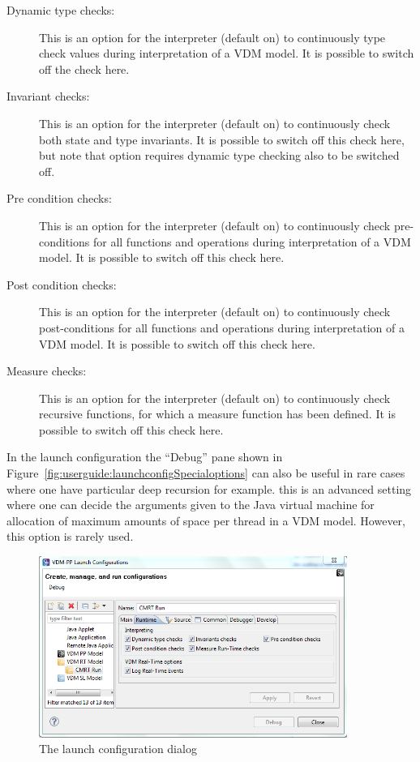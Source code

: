 \documentclass{overturerepchap}
\begin{document}
\begin{description}
\item[Dynamic type checks:] This is an option for the interpreter (default on) 
  to continuously type check  values during interpretation of a VDM model.
  It is possible to switch off the check here.
\item[Invariant checks:] This is an option for the interpreter (default on) 
  to continuously check both state and type invariants.
  It is possible to switch off
  this check here, but note that option requires dynamic type
  checking also to be switched off.
\item[Pre condition checks:] This is an option for the interpreter (default on) 
  to continuously check pre-conditions for all functions and operations
  during interpretation of a VDM model. It is possible to switch off
  this check here.
\item[Post condition checks:] This is an option for the interpreter (default on) 
  to continuously check post-conditions for all functions and operations
  during interpretation of a VDM model. It is possible to switch off
  this check here.
\item[Measure checks:] This is an option for the interpreter (default
  on) to continuously check recursive functions, for which a
  measure function has been defined. It is possible to switch off this
  check here.
\end{description}

In the launch
configuration the ``Debug'' pane shown in
Figure~\ref{fig:userguide:launchconfigSpecialoptions} can also be
useful in rare cases where one have particular deep recursion for
example. this is an advanced setting where one can decide the
arguments given to the Java virtual machine for allocation of maximum
amounts of space per thread in a VDM model. However, this option is
rarely used.

\begin{figure}[htp]
\begin{center}
  \includegraphics[width=380px]{screenDumps/launchconfigRToptions}
  \caption{The launch configuration dialog}
  \label{fig:userguide:launchconfigRToptions}
\end{center}
\end{figure}
\end{document}
